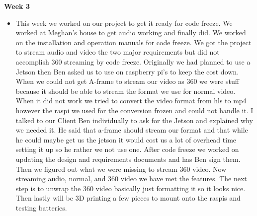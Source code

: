             \textbf{Week 3}
            \begin{itemize}
                \item This week we worked on our project to get it ready for code freeze. We worked at Meghan’s house to get audio working and finally did. We worked on the installation and operation manuals for code freeze. We got the project to stream audio and video the two major requirements but did not accomplish 360 streaming by code freeze. Originally we had planned to use a Jetson then Ben asked us to  use on raspberry pi’s to keep the cost down. When we could not get A-frame to stream our video as 360 we were stuff because it should be able to stream the format we use for normal video. When it did not work we tried to convert the video format from hls to mp4 however the raspi we used for the conversion frozen and could not handle it. I talked to our Client Ben individually to ask for the Jetson and explained why we needed it. He said that a-frame should stream our format and that while he could maybe get us the jetson it would cost us a lot of overhead time setting it up so he rather we not use one. After code freeze we worked on updating the design and requirements documents and has Ben sign them. Then we figured out what we were missing to stream 360 video. Now streaming audio, normal, and 360 video we have met the features. The next step is to unwrap the 360 video basically just formatting it so it looks nice. Then lastly will be 3D printing a few pieces to mount onto the raspis and testing batteries.
            \end{itemize}
            

